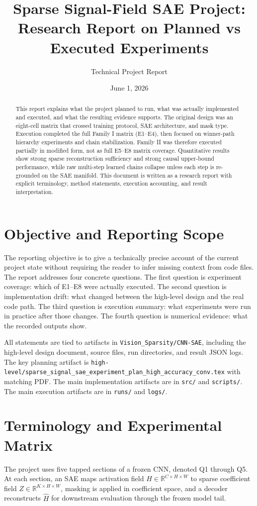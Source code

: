 \documentclass[11pt]{article}
\title{Sparse Signal-Field SAE Project: Research Report on Planned vs Executed Experiments}
\author{Technical Project Report}
\date{June 1, 2026}
\begin{document}
\maketitle

\begin{abstract}
This report explains what the project planned to run, what was actually implemented and executed, and what the resulting evidence supports. The original design was an eight-cell matrix that crossed training protocol, SAE architecture, and mask type. Execution completed the full Family I matrix (E1--E4), then focused on winner-path hierarchy experiments and chain stabilization. Family II was therefore executed partially in modified form, not as full E5--E8 matrix coverage. Quantitative results show strong sparse reconstruction sufficiency and strong causal upper-bound performance, while raw multi-step learned chains collapse unless each step is re-grounded on the SAE manifold. This document is written as a research report with explicit terminology, method statements, execution accounting, and result interpretation.
\end{abstract}

\section{Objective and Reporting Scope}
The reporting objective is to give a technically precise account of the current project state without requiring the reader to infer missing context from code files. The report addresses four concrete questions. The first question is experiment coverage: which of E1--E8 were actually executed. The second question is implementation drift: what changed between the high-level design and the real code path. The third question is execution summary: what experiments were run in practice after those changes. The fourth question is numerical evidence: what the recorded outputs show.

All statements are tied to artifacts in \texttt{Vision\_Sparsity/CNN-SAE}, including the high-level design document, source files, run directories, and result JSON logs. The key planning artifact is \texttt{high-level/sparse\_signal\_sae\_experiment\_plan\_high\_accuracy\_conv.tex} with matching PDF. The main implementation artifacts are in \texttt{src/} and \texttt{scripts/}. The main execution artifacts are in \texttt{runs/} and \texttt{logs/}.

\section{Terminology and Experimental Matrix}
The project uses five tapped sections of a frozen CNN, denoted Q1 through Q5. At each section, an SAE maps activation field $H \in \mathbb{R}^{C\times H\times W}$ to sparse coefficient field $Z \in \mathbb{R}^{K\times H\times W}$, masking is applied in coefficient space, and a decoder reconstructs $\hat{H}$ for downstream evaluation through the frozen model tail.
\end{document}
